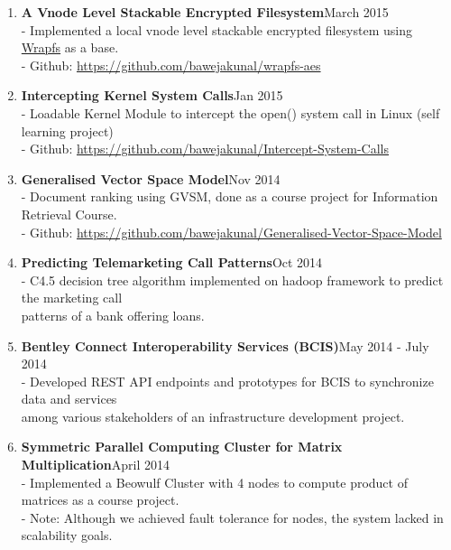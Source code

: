 \documentclass{article}
\begin{document}
\begin{enumerate}
    \item \textbf{A Vnode Level Stackable Encrypted Filesystem}{\hfill March 2015}\\
    - Implemented a local vnode level stackable encrypted filesystem using \href{http://wrapfs.filesystems.org/}{Wrapfs} as a base.\\
    - Github: \href{https://github.com/bawejakunal/wrapfs-aes}{https://github.com/bawejakunal/wrapfs-aes}
    
    \item \textbf{Intercepting Kernel System Calls}{\hfill Jan 2015}\\
    - Loadable Kernel Module to intercept the open() system call in Linux (self learning project)\\
    - Github: \href{https://github.com/bawejakunal/Intercept-System-Calls}{https://github.com/bawejakunal/Intercept-System-Calls}

    \item \textbf{Generalised Vector Space Model}{\hfill Nov 2014}\\
    - Document ranking using GVSM, done as a course project for Information Retrieval Course.\\
    - Github: \href{https://github.com/bawejakunal/Generalised-Vector-Space-Model}{https://github.com/bawejakunal/Generalised-Vector-Space-Model}
    
    \item \textbf{Predicting Telemarketing Call Patterns}{\hfill Oct 2014}\\
    - C4.5 decision tree algorithm implemented on hadoop framework to predict the marketing call\\
    \hspace*{0.7em}patterns of a bank offering loans.

    \item \textbf{Bentley Connect Interoperability Services (BCIS)}{\hfill May 2014 - July 2014}\\
    - Developed REST API endpoints and prototypes for BCIS to synchronize data and services\\
    \hspace*{0.7em}among various stakeholders of an infrastructure development project.
    
    \item \textbf{Symmetric Parallel Computing Cluster for Matrix Multiplication}{\hfill April 2014}\\
    - Implemented a Beowulf Cluster with 4 nodes to compute product of matrices as a course project.\\
    - Note: Although we achieved fault tolerance for nodes, the system lacked in scalability goals.
    

\end{enumerate}
\end{document}
